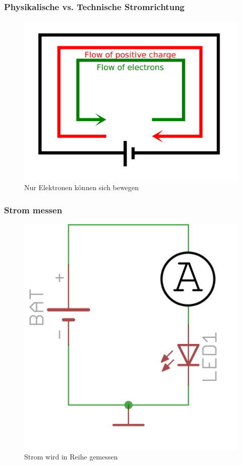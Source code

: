 \begin{frame}
  \frametitle{Physikalische vs. Technische Stromrichtung}
  \begin{center}
    \begin{figure}
      \includegraphics[width=.7\textwidth,height=.75\textheight,keepaspectratio]{e02/Current_notation.png}
      \caption{Nur Elektronen können sich bewegen \cite{stromrichtung}}
      \label{fig_stromrichtung}
    \end{figure}
  \end{center}
\end{frame}

\begin{frame}
  \frametitle{Strom messen}
  \begin{center}
    \begin{figure}
      \includegraphics[width=.5\textwidth,height=.75\textheight,keepaspectratio]{e02/reiheAmpare.png}
      \caption{Strom wird in Reihe gemessen}
    \end{figure}
  \end{center}
\end{frame}

